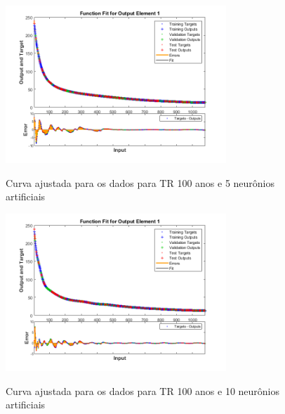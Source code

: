 \begin{figure}[h]
    \caption{Curva ajustada para os dados para TR 100 anos e 5 neurônios artificiais}
    \centering
    \includegraphics[width=0.74\textwidth]{Textuais/Figuras/NN/tr100-5neuronio.png}
    \label{fig:tr100-5n}
\end{figure}

\begin{figure}[h]
    \caption{Curva ajustada para os dados para TR 100 anos e 10 neurônios artificiais}
    \centering
    \includegraphics[width=0.74\textwidth]{Textuais/Figuras/NN/tr100-10neuronio.png}
    \label{fig:tr100-10n}
\end{figure}

